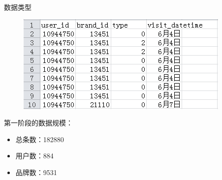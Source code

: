 \documentclass{beamer}
\begin{document}
\begin{frame}{数据类型}

\begin{figure}
\includegraphics{./data_details}
\end{figure}

第一阶段的数据规模：
\begin{itemize}
\item 总条数：182880
\item 用户数：884
\item 品牌数：9531 
\end{itemize}

\end{frame}
\end{document}
